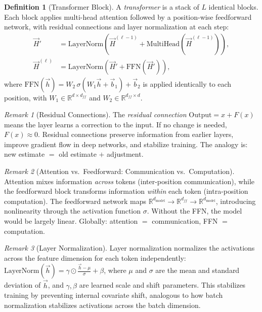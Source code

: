 \documentclass[11pt]{article}
\theoremstyle{definition}
\newtheorem{definition}{Definition}[section]
\theoremstyle{plain}
\theoremstyle{remark}
\newtheorem{remark}{Remark}[section]
\begin{document}
\begin{definition}[Transformer Block]
    A \emph{transformer} is a stack of $L$ identical blocks. Each block applies multi-head attention followed by a position-wise feedforward network, with residual connections and layer normalization at each step:
    \begin{align}
        \vec{H}' &= \text{LayerNorm}\!\left(\vec{H}^{(\ell-1)} + \text{MultiHead}(\vec{H}^{(\ell-1)})\right), \\
        \vec{H}^{(\ell)} &= \text{LayerNorm}\!\left(\vec{H}' + \text{FFN}(\vec{H}')\right),
    \end{align}
    where $\text{FFN}(\vec{h}) = W_2 \, \sigma(W_1 \vec{h} + \vec{b}_1) + \vec{b}_2$ is applied identically to each position, with $W_1 \in \mathbb{R}^{d \times d_{ff}}$ and $W_2 \in \mathbb{R}^{d_{ff} \times d}$.
\end{definition}

\begin{remark}[Residual Connections]
    The \textit{residual connection} $\text{Output} = x + F(x)$ means the layer learns a correction to the input. If no change is needed, $F(x) \approx 0$. Residual connections preserve information from earlier layers, improve gradient flow in deep networks, and stabilize training. The analogy is: new estimate $=$ old estimate $+$ adjustment.
\end{remark}

\begin{remark}[Attention vs.\ Feedforward: Communication vs.\ Computation]
    Attention mixes information \emph{across} tokens (inter-position communication), while the feedforward block transforms information \emph{within} each token (intra-position computation). The feedforward network maps $\mathbb{R}^{d_{\text{model}}} \to \mathbb{R}^{d_{ff}} \to \mathbb{R}^{d_{\text{model}}}$, introducing nonlinearity through the activation function $\sigma$. Without the FFN, the model would be largely linear. Globally: attention $=$ communication, FFN $=$ computation.
\end{remark}

\begin{remark}[Layer Normalization]
    Layer normalization normalizes the activations across the feature dimension for each token independently: $\text{LayerNorm}(\vec{h}) = \gamma \odot \frac{\vec{h} - \mu}{\sigma} + \beta$, where $\mu$ and $\sigma$ are the mean and standard deviation of $\vec{h}$, and $\gamma, \beta$ are learned scale and shift parameters. This stabilizes training by preventing internal covariate shift, analogous to how batch normalization stabilizes activations across the batch dimension.
\end{remark}
\end{document}
